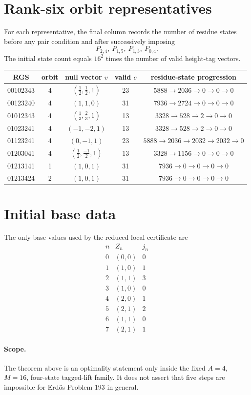 \documentclass[11pt]{article}
\newcommand{\PPair}[2]{P_{#1,#2}}
\begin{document}
\section{Rank-six orbit representatives}\label{app:rank6}
For each representative, the final column records the number of residue states
before any pair condition and after successively imposing
\[
\PPair{2}{4},\ \PPair{1}{5},\ \PPair{1}{3},\ \PPair{0}{4}.
\]
The initial state count equals $16^2$ times the number of valid height-tag
vectors.

\begin{center}
\scriptsize
\begin{tabular}{c c c c c}
\toprule
RGS & orbit & null vector $v$ & valid $c$ & residue-state progression\\
\midrule
00102343 & 4 & $(\frac{1}{2}, \frac{1}{2}, 1)$ & 23 & $5888\to2036\to0\to0\to0$ \\
00123240 & 4 & $(1, 1, 0)$ & 31 & $7936\to2724\to0\to0\to0$ \\
01012343 & 4 & $(\frac{1}{3}, \frac{2}{3}, 1)$ & 13 & $3328\to528\to2\to0\to0$ \\
01023241 & 4 & $(-1, -2, 1)$ & 13 & $3328\to528\to2\to0\to0$ \\
01123241 & 4 & $(0, -1, 1)$ & 23 & $5888\to2036\to2032\to2032\to0$ \\
01203041 & 4 & $(\frac{1}{2}, \frac{-1}{2}, 1)$ & 13 & $3328\to1156\to0\to0\to0$ \\
01213141 & 1 & $(1, 0, 1)$ & 31 & $7936\to0\to0\to0\to0$ \\
01213424 & 2 & $(1, 0, 1)$ & 31 & $7936\to0\to0\to0\to0$ \\
\bottomrule
\end{tabular}
\end{center}

\section{Initial base data}
The only base values used by the reduced local certificate are
\[
\begin{array}{c|c|c}
n&Z_n&j_n\\\hline
0&(0,0)&0\\
1&(1,0)&1\\
2&(1,1)&3\\
3&(1,0)&0\\
4&(2,0)&1\\
5&(2,1)&2\\
6&(1,1)&0\\
7&(2,1)&1
\end{array}
\]

\paragraph{Scope.}
The theorem above is an optimality statement only inside the fixed
$A=4$, $M=16$, four-state tagged-lift family. It does not assert that five
steps are impossible for Erd\H{o}s Problem 193 in general.
\end{document}

